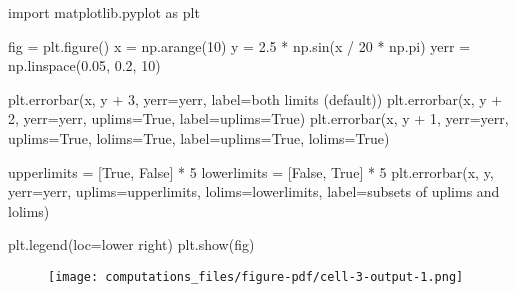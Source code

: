 \documentclass[
  letterpaper,
  DIV=11,
  numbers=noendperiod]{scrartcl}
\newenvironment{Shaded}{\begin{snugshade}}{\end{snugshade}}
\newcommand{\DecValTok}[1]{\textcolor[rgb]{0.68,0.00,0.00}{#1}}
\newcommand{\FloatTok}[1]{\textcolor[rgb]{0.68,0.00,0.00}{#1}}
\newcommand{\ImportTok}[1]{\textcolor[rgb]{0.00,0.46,0.62}{#1}}
\newcommand{\NormalTok}[1]{\textcolor[rgb]{0.00,0.23,0.31}{#1}}
\newcommand{\OperatorTok}[1]{\textcolor[rgb]{0.37,0.37,0.37}{#1}}
\newcommand{\StringTok}[1]{\textcolor[rgb]{0.13,0.47,0.30}{#1}}
\newcommand{\VariableTok}[1]{\textcolor[rgb]{0.07,0.07,0.07}{#1}}
\begin{document}
\begin{Shaded}
\begin{Highlighting}[]
\ImportTok{import}\NormalTok{ matplotlib.pyplot }\ImportTok{as}\NormalTok{ plt}

\NormalTok{fig }\OperatorTok{=}\NormalTok{ plt.figure()}
\NormalTok{x }\OperatorTok{=}\NormalTok{ np.arange(}\DecValTok{10}\NormalTok{)}
\NormalTok{y }\OperatorTok{=} \FloatTok{2.5} \OperatorTok{*}\NormalTok{ np.sin(x }\OperatorTok{/} \DecValTok{20} \OperatorTok{*}\NormalTok{ np.pi)}
\NormalTok{yerr }\OperatorTok{=}\NormalTok{ np.linspace(}\FloatTok{0.05}\NormalTok{, }\FloatTok{0.2}\NormalTok{, }\DecValTok{10}\NormalTok{)}

\NormalTok{plt.errorbar(x, y }\OperatorTok{+} \DecValTok{3}\NormalTok{, yerr}\OperatorTok{=}\NormalTok{yerr, label}\OperatorTok{=}\StringTok{\textquotesingle{}both limits (default)\textquotesingle{}}\NormalTok{)}
\NormalTok{plt.errorbar(x, y }\OperatorTok{+} \DecValTok{2}\NormalTok{, yerr}\OperatorTok{=}\NormalTok{yerr, uplims}\OperatorTok{=}\VariableTok{True}\NormalTok{, label}\OperatorTok{=}\StringTok{\textquotesingle{}uplims=True\textquotesingle{}}\NormalTok{)}
\NormalTok{plt.errorbar(x, y }\OperatorTok{+} \DecValTok{1}\NormalTok{, yerr}\OperatorTok{=}\NormalTok{yerr, uplims}\OperatorTok{=}\VariableTok{True}\NormalTok{, lolims}\OperatorTok{=}\VariableTok{True}\NormalTok{,}
\NormalTok{             label}\OperatorTok{=}\StringTok{\textquotesingle{}uplims=True, lolims=True\textquotesingle{}}\NormalTok{)}

\NormalTok{upperlimits }\OperatorTok{=}\NormalTok{ [}\VariableTok{True}\NormalTok{, }\VariableTok{False}\NormalTok{] }\OperatorTok{*} \DecValTok{5}
\NormalTok{lowerlimits }\OperatorTok{=}\NormalTok{ [}\VariableTok{False}\NormalTok{, }\VariableTok{True}\NormalTok{] }\OperatorTok{*} \DecValTok{5}
\NormalTok{plt.errorbar(x, y, yerr}\OperatorTok{=}\NormalTok{yerr, uplims}\OperatorTok{=}\NormalTok{upperlimits, lolims}\OperatorTok{=}\NormalTok{lowerlimits,}
\NormalTok{             label}\OperatorTok{=}\StringTok{\textquotesingle{}subsets of uplims and lolims\textquotesingle{}}\NormalTok{)}

\NormalTok{plt.legend(loc}\OperatorTok{=}\StringTok{\textquotesingle{}lower right\textquotesingle{}}\NormalTok{)}
\NormalTok{plt.show(fig)}
\end{Highlighting}
\end{Shaded}

\begin{figure}[H]

{\centering \texttt{[image: computations\_files/figure-pdf/cell-3-output-1.png]}

}

\end{figure}
\end{document}
